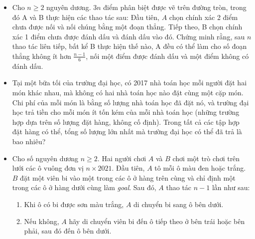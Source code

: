 \documentclass[11pt]{scrartcl}
\begin{document}
\begin{itemize}[label=, leftmargin=0em, itemsep=-0em]

    \item \begin{btvn}
        Cho $n \geq 2$ nguyên dương. $3n$ điểm phân biệt được vẽ trên đường tròn, trong đó A và B thực hiện các thao tác sau: Đầu tiên, $A$ chọn chính xác 2 điểm chưa được nối và nối chúng bằng một đoạn thẳng. Tiếp theo, B chọn chính xác 1 điểm chưa được đánh dấu và đánh dấu vào đó. Chứng minh rằng, sau $n$ thao tác liên tiếp, bất kể B thực hiện thế nào, A đều có thể làm cho số đoạn thẳng không ít hơn $\displaystyle \frac{n-1}{6}$, nối một điểm được đánh dấu và một điểm không có đánh dấu.
    \end{btvn}

  

    \item \begin{btvn}
        Tại một bữa tối của trường đại học, có 2017 nhà toán học mỗi người đặt hai món khác nhau, mà không có hai nhà toán học nào đặt cùng một cặp món. Chi phí của mỗi món là bằng số lượng nhà toán học đã đặt nó, và trường đại học trả tiền cho mỗi món ít tốn kém của mỗi nhà toán học (những trường hợp dựa trên số lượng đặt hàng, không cố định). Trong tất cả các tập hợp đặt hàng có thể, tổng số lượng lớn nhất mà trường đại học có thể đã trả là bao nhiêu?
    \end{btvn}

    \item \begin{btvn}
        Cho số nguyên dương $n \geq 2$. Hai người chơi $A$ và $B$ chơi một trò chơi trên lưới các ô vuông đơn vị $n \times 2021$. Đầu tiên, $A$ tô mỗi ô màu đen hoặc trắng. $B$ đặt một viên bi vào một trong các ô ở hàng trên cùng và chỉ định một trong các ô ở hàng dưới cùng làm \textit{goal}. Sau đó, $A$ thao tác $n - 1$ lần như sau:
        \begin{enumerate}
            \item Khi ô có bi được sơn màu trắng, $A$ di chuyển bi sang ô bên dưới.
            \item Nếu không, $A$ hãy di chuyển viên bi đến ô tiếp theo ở bên trái hoặc bên phải, sau đó đến ô bên dưới.
            

\end{enumerate}
\end{btvn}
\end{itemize}
\end{document}
